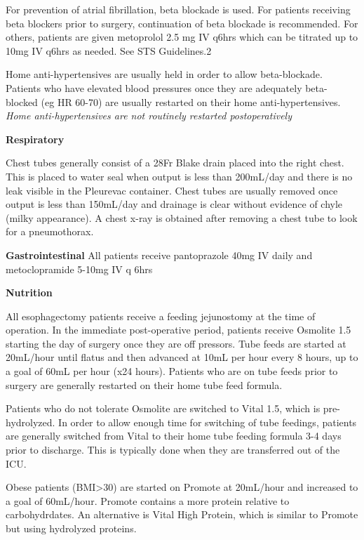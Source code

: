 \documentclass[
]{book}
\begin{document}
For prevention of atrial fibrillation, beta blockade is used. For patients receiving beta blockers prior to surgery, continuation of beta blockade is recommended. For others, patients are given metoprolol 2.5 mg IV q6hrs which can be titrated up to 10mg IV q6hrs as needed. See STS Guidelines.\hspace{0pt}2\hspace{0pt}

Home anti-hypertensives are usually held in order to allow beta-blockade. Patients who have elevated blood pressures once they are adequately beta-blocked (eg HR 60-70) are usually restarted on their home anti-hypertensives. \emph{Home anti-hypertensives are not routinely restarted postoperatively}

\textbf{Respiratory}

Chest tubes generally consist of a 28Fr Blake drain placed into the right chest. This is placed to water seal when output is less than 200mL/day and there is no leak visible in the Pleurevac container. Chest tubes are usually removed once output is less than 150mL/day and drainage is clear without evidence of chyle (milky appearance). A chest x-ray is obtained after removing a chest tube to look for a pneumothorax.

\textbf{Gastrointestinal}
All patients receive pantoprazole 40mg IV daily and metoclopramide 5-10mg IV q 6hrs

\textbf{Nutrition}

All esophagectomy patients receive a feeding jejunostomy at the time of operation. In the immediate post-operative period, patients receive Osmolite 1.5 starting the day of surgery once they are off pressors. Tube feeds are started at 20mL/hour until flatus and then advanced at 10mL per hour every 8 hours, up to a goal of 60mL per hour (x24 hours). Patients who are on tube feeds prior to surgery are generally restarted on their home tube feed formula.

Patients who do not tolerate Osmolite are switched to Vital 1.5, which is pre-hydrolyzed. In order to allow enough time for switching of tube feedings, patients are generally switched from Vital to their home tube feeding formula 3-4 days prior to discharge. This is typically done when they are transferred out of the ICU.

Obese patients (BMI\textgreater30) are started on Promote at 20mL/hour and increased to a goal of 60mL/hour. Promote contains a more protein relative to carbohydrdates. An alternative is Vital High Protein, which is similar to Promote but using hydrolyzed proteins.
\end{document}
